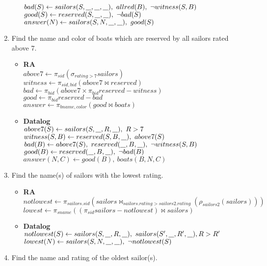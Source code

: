 \documentclass{article}
\newcommand{\anyvar}{\underline{\hspace{0.8em}}}
\newcommand{\RA}{\textbf{RA}}
\newcommand{\DL}{\textbf{Datalog}}
\begin{document}
\begin{enumerate}
\begin{itemize}
	$ bad(S) \gets sailors(S, \anyvar, \anyvar, \anyvar),\ allred(B),\ \neg witness(S, B) $ \\
	$ good(S) \gets reserved(S, \anyvar, \anyvar),\ \neg bad(S) $ \\
	$ answer(N) \gets sailors(S, N, \anyvar, \anyvar),\ good(S) $
	\end{itemize}
\item Find the name and color of boats which are reserved by all sailors rated above 7.
	\begin{itemize}
	\item \RA \\
	$ above7 \gets \pi_{sid}(\sigma_{rating > 7} sailors) $ \\
	$ witness \gets \pi_{sid, bid}(above7 \bowtie reserved) $ \\
	$ bad \gets \pi_{bid}(above7 \times \pi_{bid}reserved - witness) $ \\
	$ good \gets \pi_{bid}reserved - bad$ \\
	$ answer \gets \pi_{bname, color}(good \bowtie boats)$
	\item \DL \\
	$ above7(S) \gets sailors(S, \anyvar, R, \anyvar), \ R > 7$ \\
	$ witness(S, B) \gets reserved(S, B, \anyvar),\ above7(S) $ \\
	$ bad(B) \gets above7(S),\ reserved(\anyvar, B, \anyvar),\ \neg witness(S, B) $ \\
	$ good(B) \gets reserved(\anyvar, B, \anyvar),\ \neg bad(B) $ \\
	$ answer(N, C) \gets good(B),\ boats(B, N, C) $
	\end{itemize}
\item Find the name(s) of sailors with the lowest rating.
	\begin{itemize}
	\item \RA \\
	$ notlowest \gets \pi_{sailors.sid}(sailors \bowtie_{sailors.rating > sailors2.rating} (\rho_{sailors2} (sailors))) $ \\
	$ lowest \gets \pi_{sname}((\pi_{sid}sailors - notlowest) \bowtie sailors) $
	\item \DL \\
	$ notlowest(S) \gets sailors(S, \anyvar, R, \anyvar), \ sailors(S', \anyvar, R', \anyvar), R > R' $ \\
	$ lowest(N) \gets sailors(S, N, \anyvar, \anyvar), \ \neg notlowest(S) $
	\end{itemize}
\item Find the name and rating of the oldest sailor(s).

\end{enumerate}
\end{document}
